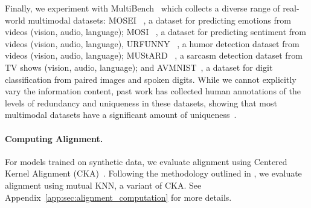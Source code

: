 Finally, we experiment with MultiBench~\citep{liang_multibench_2021} which collects a diverse range of real-world multimodal datasets: MOSEI ~\citep{bagher_zadeh_multimodal_2018}, a dataset for predicting emotions from videos (vision, audio, language); MOSI ~\citep{zadeh_mosi_2016}, a dataset for predicting sentiment from videos (vision, audio, language), URFUNNY ~\citep{hasan_ur-funny_2019}, a humor detection dataset from videos (vision, audio, language); MUStARD ~\citep{castro_towards_2019}, a sarcasm detection dataset from TV shows (vision, audio, language); and AVMNIST~\citep{perez-rua_mfas_2019}, a dataset for digit classification from paired images and spoken digits. While we cannot explicitly vary the information content, past work has collected human annotations of the levels of redundancy and uniqueness in these datasets, showing that most multimodal datasets have a significant amount of uniqueness~\citep{liang2023quantifying}. 

\paragraph{Computing Alignment.} For models trained on synthetic data, we evaluate alignment using Centered Kernel Alignment (CKA)~\citep{kornblith_similarity_2019}. Following the methodology outlined in \citet{huh_platonic_2024}, we evaluate alignment using mutual KNN, a variant of CKA. See Appendix~\ref{app:sec:alignment_computation} for more details.